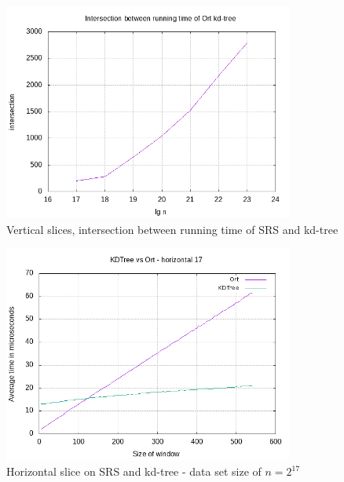 \begin{figure}[h]
    \centering
    \includegraphics[width = 0.85\textwidth]{pictures/analysis/vert.png}
    \caption{Vertical slices, intersection between running time of SRS and kd-tree}\label{fig:vert_intersection}
\end{figure}



\begin{figure}[h]
    \centering
    \includegraphics[width = 0.85\textwidth]{pictures/analysis/hori_17.png}
    \caption{Horizontal slice on SRS and kd-tree - data set size of $n=2^{17}$}\label{fig:hori_17}
\end{figure}

